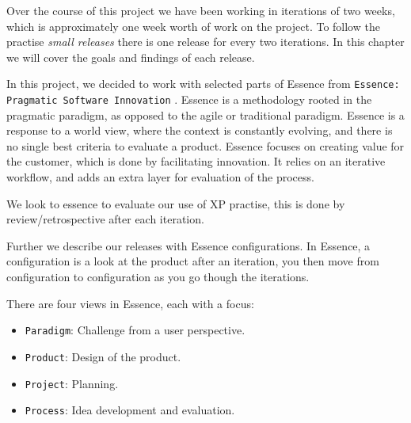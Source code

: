 Over the course of this project we have been working in iterations of two weeks, which is approximately one week worth of work on the project. To follow the practise \textit{small releases} there is one release for every two iterations. In this chapter we will cover the goals and findings of each release.

In this project, we decided to work with selected parts of Essence from \texttt{Essence: Pragmatic Software Innovation} \citep{essence:config}. Essence is a methodology rooted in the pragmatic paradigm, as opposed to the agile or traditional paradigm. Essence is a response to a world view, where the context is constantly evolving, and there is no single best criteria to evaluate a product. Essence focuses on creating value for the customer, which is done by facilitating innovation. It relies on an iterative workflow, and adds an extra layer for evaluation of the process.

We look to essence to evaluate our use of XP practise, this is done by review/retrospective after each iteration.

Further we describe our releases with Essence configurations. In Essence, a configuration is a look at the product after an iteration, you then move from configuration to configuration as you go though the iterations. 

There are four views in Essence, each with a focus: 
\begin{itemize}
\item \texttt{Paradigm}: Challenge from a user perspective.
\item \texttt{Product}: Design of the product.
\item \texttt{Project}: Planning.
\item \texttt{Process}: Idea development and evaluation.
\end{itemize}



